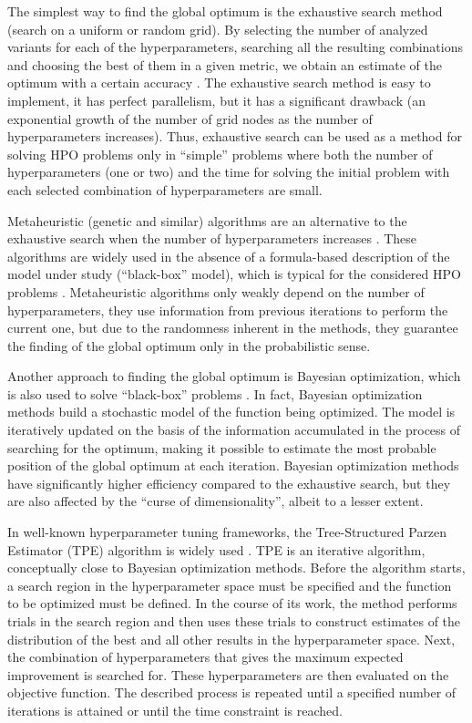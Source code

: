 \documentclass[preprint,12pt]{elsarticle}
\begin{document}
The simplest way to find the global optimum is the exhaustive search method (search on a uniform \cite{Bao2006} or random \cite{Bergstra2012} grid). 
By selecting the number of analyzed variants for each of the hyperparameters, searching all the resulting combinations and choosing the best of them in a given metric, we obtain an estimate of the optimum with a certain accuracy \cite{Nevendra2022}. The exhaustive search method is easy to implement, it has perfect parallelism, but it has a significant drawback (an exponential growth of the number of grid nodes as the number of hyperparameters increases). Thus, exhaustive search can be used as a method for solving HPO problems only in ``simple'' problems where both the number of hyperparameters (one or two) and the time for solving the initial problem with each selected combination of hyperparameters are small. 

Metaheuristic (genetic and similar) algorithms are an alternative to the exhaustive search when the number of hyperparameters increases \cite{Opara2019}. These algorithms are widely used in the absence of a formula-based description of the model under study (``black-box'' model), which is typical for the considered HPO problems \cite{Zhou2021,Yang2022}. Metaheuristic algorithms only weakly depend on the number of hyperparameters, they use information from previous iterations to perform the current one, but due to the randomness inherent in the methods, they guarantee the finding of the global optimum only in the probabilistic sense.

Another approach to finding the global optimum is Bayesian optimization, which is also used to solve ``black-box'' problems \cite{Frazier2018,Archetti2019}. In fact, Bayesian optimization methods build a stochastic model of the function being optimized. The model is iteratively updated on the basis of the information accumulated in the process of searching for the optimum, making it possible to estimate the most probable position of the global optimum at each iteration. Bayesian optimization methods have significantly higher efficiency compared to the exhaustive search, but they are also affected by the ``curse of dimensionality'', albeit to a lesser extent. 

In well-known hyperparameter tuning frameworks, the Tree-Structured Parzen Estimator (TPE) algorithm is widely used \cite{hyperopt,NIPS2011}. TPE is an iterative algorithm, conceptually close to Bayesian optimization methods. Before the algorithm starts, a search region in the hyperparameter space must be specified and the function to be optimized must be defined. In the course of its work, the method performs trials in the search region and then uses these trials to construct estimates of the distribution of the best and all other results in the hyperparameter space. Next, the combination of hyperparameters that gives the maximum expected improvement is searched for. These hyperparameters are then evaluated on the objective function. The described process is repeated until a specified number of iterations is attained or until the time constraint is reached.  
\end{document}
